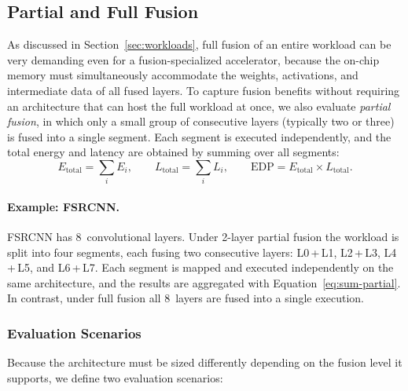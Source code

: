 \subsection{Partial and Full Fusion}
\label{sec:partial-full-fusion}

As discussed in Section~\ref{sec:workloads}, full fusion of an entire
workload can be very demanding even for a fusion-specialized
accelerator, because the on-chip memory must simultaneously
accommodate the weights, activations, and intermediate data of all
fused layers.
To capture fusion benefits without requiring an architecture that can
host the full workload at once, we also evaluate \emph{partial fusion},
in which only a small group of consecutive layers (typically two or
three) is fused into a single segment.
Each segment is executed independently, and the total energy and latency
are obtained by summing over all segments:
%
\begin{equation}
  E_{\text{total}} = \sum_{i} E_{i},
  \qquad
  L_{\text{total}} = \sum_{i} L_{i},
  \qquad
  \text{EDP} = E_{\text{total}} \times L_{\text{total}}.
  \label{eq:sum-partial}
\end{equation}
%

\paragraph{Example: FSRCNN.}
FSRCNN has 8~convolutional layers.
Under 2-layer partial fusion the workload is split into four segments,
each fusing two consecutive layers: L0\,+\,L1, L2\,+\,L3, L4\,+\,L5,
and L6\,+\,L7.
Each segment is mapped and executed independently on the same
architecture, and the results are aggregated with
Equation~\eqref{eq:sum-partial}.
In contrast, under full fusion all 8~layers are fused into a single
execution.

\subsubsection{Evaluation Scenarios}
\label{sec:scenarios}

Because the architecture must be sized differently depending on the
fusion level it supports, we define two evaluation scenarios:

